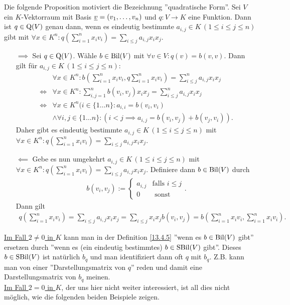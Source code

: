 \documentclass[../../main.tex]{subfiles}
\begin{document}
\begin{pro}\label{13.4.7}
Die folgende Proposition motiviert die Bezeichnung ''quadratische Form''. Sei $V$ ein $K$-Vektorraum mit Basis ${\underline v}=(v_1,\ldots ,v_n)$ und $q: V\to K$ eine Funktion. Dann ist $q\in \operatorname{Q}(V)$ genau dann, wenn es eindeutig bestimmte $a_{i,j}\in K\, (1\le i\le j\le n)$ gibt mit $\forall x\in K^n: q\left(\sum_{i=1}^nx_iv_i\right)=\sum_{i\le j}a_{i,j}x_ix_j$.
\end{pro}
\begin{cproof}
\begin{itemize}
\item[$\implies$] Sei $q\in \operatorname{Q}(V)$. Wähle $b\in \operatorname{Bil}(V)$ mit $\forall v\in V: q(v)=b(v,v)$. Dann gilt für $a_{i,j}\in K\, (1\le i\le j\le n)$:
\begin{align*}
&\forall x\in K^n: b\left(\sum_{i=1}^n x_iv_i, q \sum_{i=1}^n x_iv_i\right)=\sum_{i\le j}^n a_{i,j}x_ix_j\\
\Longleftrightarrow&\forall x\in K^n:\sum_{i,j=1}^n b(v_i,v_j)x_ix_j=\sum_{i\le j}^n a_{i,j}x_ix_j\\
\Longleftrightarrow&\forall x\in K^n (i\in\{1\ldots n\}: a_{i,i}=b(v_i,v_i)\\
&\land \forall i,j\in\{1\ldots n\}: (i<j\implies a_{i,j}=b(v_i,v_j)+b(v_j,v_i)).
\end{align*}
Daher gibt es eindeutig bestimmte $a_{i,j}\in K\, (1\le i\le j\le n)$ mit $\forall x\in K^n: q\left(\sum_{i=1}^nx_iv_i\right)=\sum_{i\le j}a_{i,j}x_ix_j$.
\item[$\impliedby$] Gebe es nun umgekehrt $a_{i,j}\in K\, (1\le i\le j\le n)$ mit $\forall x\in K^n: q\left(\sum_{i=1}^nx_iv_i\right)=\sum_{i\le j}a_{i,j}x_ix_j$. Definiere dann $b\in \operatorname{Bil}(V)$ durch
\begin{align*}
b(v_i,v_j):=\begin{cases}a_{i,j} & \text{falls }i\le j\\ 0 & \text{ sonst}\end{cases}.
\end{align*}
Dann gilt
\begin{align*}
q\left(\sum_{i=1}^nx_iv_i\right)=\sum_{i\le j}a_{i,j}x_ix_j=\sum_{i\le j}x_ix_jb(v_i,v_j)=b\left(\sum_{i=1}^n x_iv_i,\sum_{i=1}^nx_iv_i\right).
\end{align*}
\end{itemize}
\end{cproof}

\begin{bem}\label{13.4.8}
\underline{Im Fall $2\neq 0$ in $K$} kann man in der Definition \ref{13.4.5} ''wenn es $b\in \operatorname{Bil}(V)$ gibt'' ersetzen durch ''wenn es (ein eindeutig bestimmtes) $b\in \operatorname{SBil}(V)$ gibt''. Dieses $b\in \operatorname{SBil}(V)$ ist natürlich $b_q$ und man identifiziert dann oft $q$ mit $b_q$. Z.B. kann man von einer ''Darstellungsmatrix von $q$'' reden und damit eine Darstellungsmatrix von $b_q$ meinen.\\
	
\noindent\underline{Im Fall $2=0$ in $K$}, der uns hier nicht weiter interessiert, ist all dies nicht möglich, wie die folgenden beiden Beispiele zeigen.
\end{bem}
	
\end{document}
